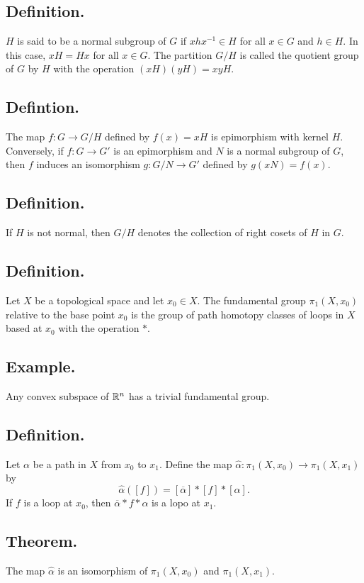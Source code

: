 \documentclass[titlepage]{article}
\begin{document}
\subsection{Definition.} $H$ is said to be a normal subgroup of $G$ if $xhx^{-1} \in H$ for all $x \in G$ and $h \in H$. In this case, $xH = Hx$ for all $x \in G$. The partition $G/H$ is called the quotient group of $G$ by $H$ with the operation $(xH)(yH) = xyH.$

\subsection{Defintion.} The map $f: G \to G/H$ defined by $f(x) = xH$ is epimorphism with kernel $H$. Conversely, if $f: G \to G'$ is an epimorphism and $N$ is a normal subgroup of $G$, then $f$ induces an isomorphism $g: G/N \to G'$ defined by $g(xN) = f(x)$.

\subsection{Definition.} If $H$ is not normal, then $G/H$ denotes the collection of right cosets of $H$ in $G$.

\subsection{Definition.} Let $X$ be a topological space and let $x_{0} \in X$. The fundamental group $\pi_{1}(X, x_{0})$ relative to the base point $x_{0}$ is the group of path homotopy classes of loops in $X$ based at $x_{0}$ with the operation $*$.

\subsection{Example.} Any convex subspace of $\mathbb{R}^{n}$ has a trivial fundamental group.

\subsection{Definition.} Let $\alpha$ be a path in $X$ from $x_{0}$ to $x_{1}$. Define the map $\hat{\alpha}: \pi_{1}(X, x_{0}) \to \pi_{1}(X, x_{1})$
by 
$$\hat{\alpha}([f]) = [\overline{\alpha}] * [f] * [\alpha].$$
If $f$ is a loop at $x_{0}$, then $\overline{\alpha} * f * \alpha$ is a lopo at $x_{1}$.

\subsection{Theorem.} The map $\hat{\alpha}$ is an isomorphism of $\pi_{1}(X, x_{0})$ and $\pi_{1}(X, x_{1})$.
\end{document}
